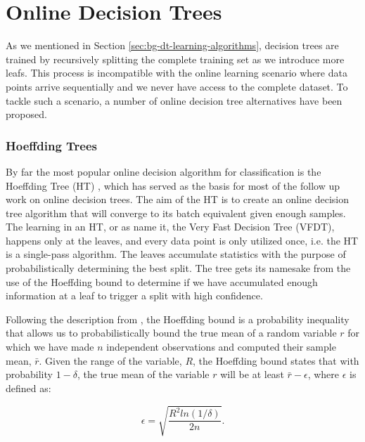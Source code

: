 \section{Online Decision Trees}
\label{sec:bg-dt-online-trees}

As we mentioned in Section \ref{sec:bg-dt-learning-algorithms}, decision trees are trained by recursively splitting the complete
training set as we introduce more leafs. This process is incompatible with the online
learning scenario where data points arrive sequentially and we never have access to
the complete dataset. To tackle such a scenario, a number of online decision tree
alternatives have been proposed.

\subsubsection*{Hoeffding Trees}

By far the most popular online decision algorithm for classification is the Hoeffding Tree (HT) \cite{vfdt},
which has served as the basis for most of the follow up work on online decision
trees. The aim of the HT is to create an online decision tree algorithm that will converge
to its batch equivalent given enough samples.
The learning in an HT, or as \citet{vfdt} name it, the Very Fast Decision
Tree (VFDT), happens only at the leaves, and every data point is only utilized
once, i.e. the HT is a single-pass algorithm. The leaves accumulate statistics
with the purpose of probabilistically determining the best split. The tree gets its
namesake from the use of the Hoeffding bound to determine if we have accumulated
enough information at a leaf to trigger a split with high confidence.

Following the description from \citet{vfdt}, the Hoeffding bound \cite{hoeffding-bound} is a probability inequality that allows
us to probabilistically bound the true mean of a random variable $r$ for which we have
made $n$ independent observations and computed their sample mean, $\bar{r}$. Given
the range of the variable, $R$, the Hoeffding bound states that with probability
$1-\delta$, the true mean of the variable $r$ will be at least $\bar{r}-\epsilon$, where
$\epsilon$ is defined as:

\begin{equation}
\epsilon = \sqrt{\frac{R^2ln(1/\delta)}{2n}}.
\end{equation}

